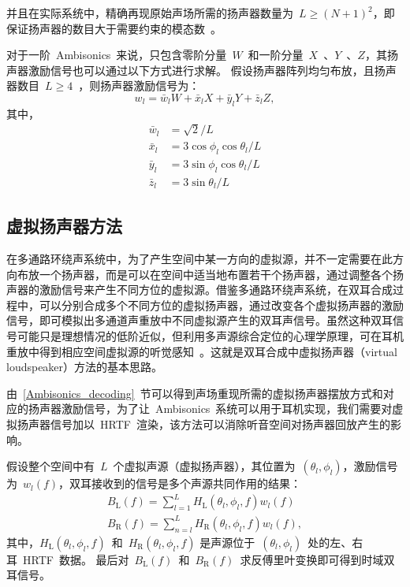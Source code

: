 并且在实际系统中，精确再现原始声场所需的扬声器数量为~$L\geq(N+1)^2$，即保证扬声器的数目大于需要约束的模态数~。

对于一阶~Ambisonics~来说，只包含零阶分量~$W$~和一阶分量~$X$~、$Y$~、$Z$，其扬声器激励信号也可以通过以下方式进行求解。
假设扬声器阵列均匀布放，且扬声器数目~$L\geq4$~，则扬声器激励信号为：
\begin{equation}
w_{l} = \bar{w}_{l}W + \bar{x}_{l}X + \bar{y}_{l}Y + \bar{z}_{l}Z,
\end{equation}
其中，
\begin{equation}
\begin{split}
\bar{w}_{l} & = \sqrt{2}/L \\
\bar{x}_{l} & = 3\cos\phi_{l}\cos\theta_{l}/L \\
\bar{y}_{l} & = 3\sin\phi_{l}\cos\theta_{l}/L \\
\bar{z}_{l} & = 3\sin\theta_{l}/L
\end{split}
\end{equation}



\subsection{虚拟扬声器方法}

在多通路环绕声系统中，为了产生空间中某一方向的虚拟源，并不一定需要在此方向布放一个扬声器，而是可以在空间中适当地布置若干个扬声器，通过调整各个扬声器的激励信号来产生不同方位的虚拟源。借鉴多通路环绕声系统，在双耳合成过程中，可以分别合成多个不同方位的虚拟扬声器，通过改变各个虚拟扬声器的激励信号，即可模拟出多通道声重放中不同虚拟源产生的双耳声信号。虽然这种双耳信号可能只是理想情况的低阶近似，但利用多声源综合定位的心理学原理，可在耳机重放中得到相应空间虚拟源的听觉感知~。这就是双耳合成中虚拟扬声器（virtual loudspeaker）方法的基本思路。 %

由~\ref{Ambisonics_decoding}~节可以得到声场重现所需的虚拟扬声器摆放方式和对应的扬声器激励信号，为了让~Ambisonics~系统可以用于耳机实现，我们需要对虚拟扬声器信号加以~HRTF~渲染，该方法可以消除听音空间对扬声器回放产生的影响。

假设整个空间中有~$L$~个虚拟声源（虚拟扬声器），其位置为~$(\theta_{l},\phi_{l})$，激励信号为~$w_{l}(f)$，双耳接收到的信号是多个声源共同作用的结果：
\begin{equation}\label{eq.loudspeaker_to_headphone}
\begin{split}
B_{\text{L}}(f) = \sum_{l=1}^{L}H_{\text{L}}(\theta_{l},\phi_{l},f)w_{l}(f)\\
B_{\text{R}}(f) = \sum_{n=l}^{L}H_{\text{R}}(\theta_{l},\phi_{l},f)w_{l}(f),
\end{split}
\end{equation}
其中，$H_{\text{L}}(\theta_{l},\phi_{l},f)$~和~$H_{\text{R}}(\theta_{l},\phi_{l},f)$
是声源位于~$(\theta_{l},\phi_{l})$~处的左、右耳~HRTF~数据。
最后对~$B_{\text{L}}(f)$~和~$B_{\text{R}}(f)$~求反傅里叶变换即可得到时域双耳信号。

